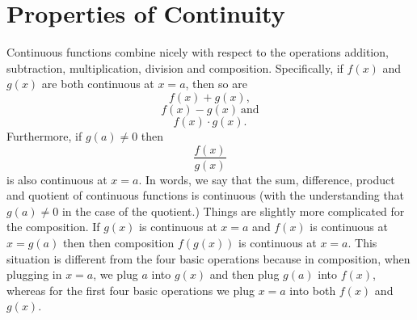 \documentclass{ximera}
\begin{document}
\section{Properties of Continuity}



Continuous functions combine nicely with respect to the operations addition, subtraction, multiplication, 
division and composition. Specifically, if $f(x)$ and $g(x)$ are both continuous at $x = a$, then so are
\[f(x) + g(x),\]
\[f(x) - g(x) \ \text{and}\]
\[f(x) \cdot g(x).\]
Furthermore, if $g(a) \neq 0$ then 
\[\frac{f(x)}{g(x)}\]
is also continuous at $x = a$. 
In words, we say that the sum, difference, product and quotient of continuous functions is continuous 
(with the understanding that $g(a) \neq 0$ in the case of the quotient.)
Things are slightly more complicated for the composition. If $g(x)$ is continuous at $x = a$ and $f(x)$ is 
continuous at $x = g(a)$ then then composition $f(g(x))$ is continuous at $x = a$. This situation is 
different from the four basic operations because in composition, when plugging in $x = a$, we plug $a$ 
into $g(x)$ and then plug $g(a)$ into $f(x)$,
whereas for the first four basic operations we plug $x = a$ into both $f(x)$ and $g(x)$.



 
\begin{center}
\begin{foldable}
\end{foldable}
\end{center}
\end{document}

